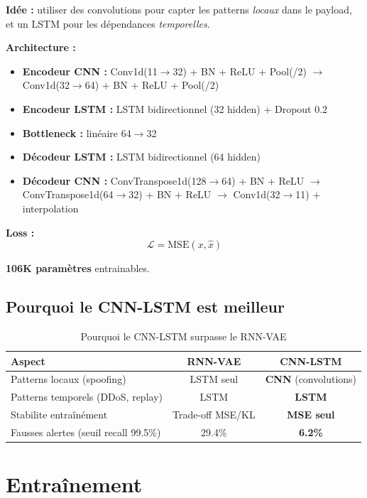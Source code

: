 \documentclass[12pt,a4paper]{article}
\begin{document}
\textbf{Idée :} utiliser des convolutions pour capter les patterns \textit{locaux} dans le payload, et un LSTM pour les dépendances \textit{temporelles}.

\textbf{Architecture :}
\begin{itemize}[noitemsep]
    \item \textbf{Encodeur CNN :} Conv1d(11$\to$32) + BN + ReLU + Pool(/2) $\to$ Conv1d(32$\to$64) + BN + ReLU + Pool(/2)
    \item \textbf{Encodeur LSTM :} LSTM bidirectionnel (32 hidden) + Dropout 0.2
    \item \textbf{Bottleneck :} linéaire 64$\to$32
    \item \textbf{Décodeur LSTM :} LSTM bidirectionnel (64 hidden)
    \item \textbf{Décodeur CNN :} ConvTranspose1d(128$\to$64) + BN + ReLU $\to$ ConvTranspose1d(64$\to$32) + BN + ReLU $\to$ Conv1d(32$\to$11) + interpolation
\end{itemize}

\textbf{Loss :}
\begin{equation}
    \mathcal{L} = \text{MSE}(x, \hat{x})
\end{equation}

\textbf{106K paramètres} entrainables.

\subsection{Pourquoi le CNN-LSTM est meilleur}

\begin{table}[H]
\centering
\begin{tabular}{lcc}
\toprule
\textbf{Aspect} & \textbf{RNN-VAE} & \textbf{CNN-LSTM} \\
\midrule
Patterns locaux (spoofing) & LSTM seul & \textbf{CNN} (convolutions) \\
Patterns temporels (DDoS, replay) & LSTM & \textbf{LSTM} \\
Stabilite entraînément & Trade-off MSE/KL & \textbf{MSE seul} \\
Fausses alertes (seuil recall 99.5\%) & 29.4\% & \textbf{6.2\%} \\
\bottomrule
\end{tabular}
\caption{Pourquoi le CNN-LSTM surpasse le RNN-VAE}
\end{table}

\section{Entraînement}
\end{document}
